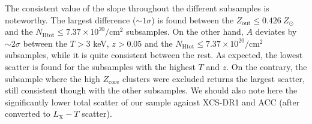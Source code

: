 \documentclass{aa}   %
\begin{document}
The consistent value of the slope throughout the different subsamples is noteworthy. The largest difference ($\sim 1\sigma$) is found between the $Z_{\text{out}}\leq 0.426\ Z_{\odot}$ and the $N_{\text{Htot}}\leq 7.37\times 10^{20}/$cm$^2$ subsamples. On the other hand, $A$ deviates by $\sim 2\sigma$ between the $T>3$ keV, $z>0.05$ and the $N_{\text{Htot}}\leq 7.37\times 10^{20}/$cm$^2$ subsamples, while it is quite consistent between the rest. As expected, the lowest scatter is found for the subsamples with the highest $T$ and $z$. On the contrary, the subsample where the high $Z_{\text{core}}$ clusters were excluded returns the largest scatter, still consistent though with the other subsamples. We should also note here the significantly lower total scatter of our sample against XCS-DR1 and ACC (after converted to $L_{\text{X}}-T$ scatter).
\end{document}
